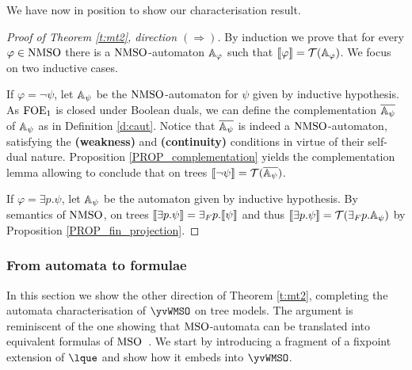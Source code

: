 We have now in position to show our characterisation result.

\begin{proof}[Proof of Theorem \ref{t:mt2}, direction $(\Rightarrow)$]
By induction we prove that for every $\varphi \in \mathrm{NMSO}$ there is a $\mathrm{NMSO}$-automaton $\mathbb{A}_\varphi$ such that $\llbracket\varphi\rrbracket = \mathcal{T}(\mathbb{A}_\varphi)$. We focus on two %
inductive cases.

  \indent If $\varphi = \neg \psi$, let $\mathbb{A}_{\psi}$ be the $\mathrm{NMSO}$-automaton for $\psi$ given by inductive hypothesis. As $\mathrm{FOE}_1$ is closed under Boolean duals, we can define the complementation $\overline{\mathbb{A}_{\psi}}$ of $\mathbb{A}_{\psi}$ as in Definition \ref{d:caut}. Notice that $\overline{\mathbb{A}_{\psi}}$ is indeed a $\mathrm{NMSO}$-automaton, satisfying the \textbf{(weakness)} and \textbf{(continuity)} conditions in virtue of their self-dual nature. Proposition \ref{PROP_complementation} yields the complementation lemma allowing to conclude that on trees $\llbracket\neg \psi\rrbracket = \mathcal{T}(\overline{\mathbb{A}_{\psi}})$.

\indent   If $\varphi = \exists p.\psi$, let $\mathbb{A}_{\psi}$ be the automaton given by inductive hypothesis. By semantics of $\mathrm{NMSO}$, on trees $\llbracket\exists p. \psi\rrbracket = {{\exists}_F p}.\llbracket\psi\rrbracket$ and thus $\llbracket\exists p.\psi\rrbracket = \mathcal{T}({{\exists}_F p}.\mathbb{A}_{\psi})$ by Proposition \ref{PROP_fin_projection}.
\end{proof} 



\subsubsection{From automata to formulae}


In this section we show the other direction of Theorem \ref{t:mt2}, completing
the automata characterisation of $\yvWMSO$ on tree models.
The argument is reminiscent of the one showing that $\mathrm{MSO}$-automata can be
translated into equivalent formulas of $\mathrm{MSO}$~\cite{Walukiewicz96}.
We start by introducing a fragment of a fixpoint extension
of $\lque$ and show how it embeds into $\yvWMSO$.

